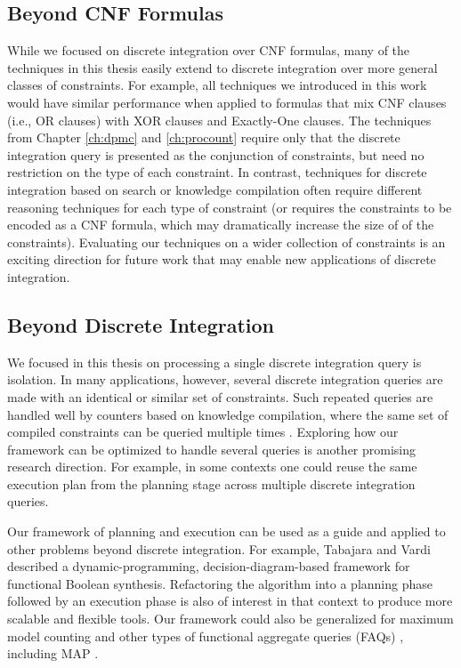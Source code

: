 \subsection{Beyond CNF Formulas}
While we focused on discrete integration over CNF formulas, many of the techniques in this thesis easily extend to discrete integration over more general classes of constraints.
For example, all techniques we introduced in this work would have similar performance when applied to formulas that mix CNF clauses (i.e., OR clauses) with XOR clauses and Exactly-One clauses. %
The techniques from Chapter \ref{ch:dpmc} and \ref{ch:procount} require only that the discrete integration query is presented as the conjunction of constraints, but need no restriction on the type of each constraint. 
In contrast, techniques for discrete integration based on search or knowledge compilation often require different reasoning techniques for each type of constraint (or requires the constraints to be encoded as a CNF formula, which may dramatically increase the size of of the constraints).
Evaluating our techniques on a wider collection of constraints is an exciting direction for future work that may enable new applications of discrete integration.


\subsection{Beyond Discrete Integration}
We focused in this thesis on processing a single discrete integration query is isolation. 
In many applications, however, several discrete integration queries are made with an identical or similar set of constraints.
Such repeated queries are handled well by counters based on knowledge compilation, where the same set of compiled constraints can be queried multiple times \cite{darwiche2002knowledge,koriche2013knowledge,LM17,darwiche2004new,OD15}.
Exploring how our framework can be optimized to handle several queries is another promising research direction.
For example, in some contexts one could reuse the same execution plan from the planning stage across multiple discrete integration queries.

Our framework of planning and execution can be used as a guide and applied to other problems beyond discrete integration.
For example, Tabajara and Vardi \cite{tabajara2017factored} described a dynamic-programming, decision-diagram-based framework for functional Boolean synthesis.
Refactoring the algorithm into a planning phase followed by an execution phase is also of interest in that context to produce more scalable and flexible tools.
Our framework could also be generalized for maximum model counting \cite{fremont2017maximum} and other types of functional aggregate queries (FAQs) \cite{KNR16}, including MAP \cite{murphy2012machine,maua2015complexity,xue2016solving}.
